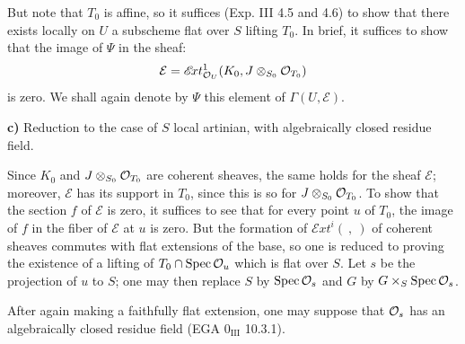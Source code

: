 But note that $T_0$ is affine, so it suffices (Exp. III 4.5 and 4.6) to show that there exists locally on $U$ a subscheme flat over $S$ lifting $T_0$. In brief, it suffices to show that the image of $\Psi$ in the sheaf:
\[
\mathcal E=\mathscr{E}\!xt^{1}_{\mathcal{O}_U}(K_0,J\otimes_{S_0}\mathcal{O}_{T_0})
\]
is zero. We shall again denote by $\Psi$ this element of $\Gamma(U,\mathcal E)$.

\noindent\textbf{c)} Reduction to the case of $S$ local artinian, with algebraically closed residue field.

Since $K_0$ and $J\otimes_{S_0}\mathcal{O}_{T_0}$ are coherent sheaves, the same holds for the sheaf $\mathcal E$; moreover, $\mathcal E$ has its support in $T_0$, since this is so for $J\otimes_{S_0}\mathcal{O}_{T_0}$. To show that the section $f$ of $\mathcal E$ is zero, it suffices to see that for every point $u$ of $T_0$, the image of $f$ in the fiber of $\mathcal E$ at $u$ is zero. But the formation of $\mathscr{E}\!xt^{i}(\ ,\ )$ of coherent sheaves commutes with flat extensions of the base, so one is reduced to proving the existence of a lifting of $T_0\cap\operatorname{Spec}\mathcal{O}_u$ which is flat over $S$. Let $s$ be the projection of $u$ to $S$; one may then replace $S$ by $\operatorname{Spec}\mathcal{O}_s$ and $G$ by $G\times_S\operatorname{Spec}\mathcal{O}_s$.

After again making a faithfully flat extension, one may suppose that $\mathcal{O}_s$ has an algebraically closed residue field (EGA $0_{\mathrm{III}}$ 10.3.1).

